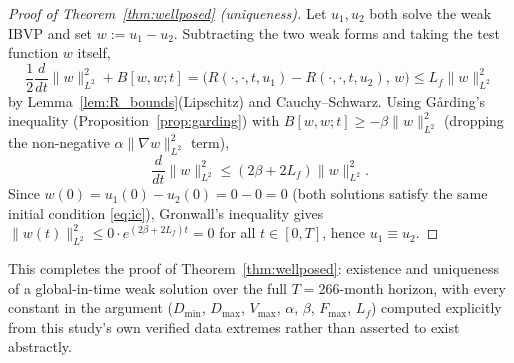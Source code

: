 \documentclass[journal]{IEEEtran}
\begin{document}
\begin{proof}[Proof of Theorem~\ref{thm:wellposed} (uniqueness)]
Let $u_1,u_2$ both solve the weak IBVP and set $w:=u_1-u_2$. Subtracting the two weak forms and taking the test function $w$ itself,
\begin{equation}
\frac{1}{2}\frac{d}{dt}\|w\|^2_{L^2} + B[w,w;t] = \big(R(\cdot,\cdot,t,u_1)-R(\cdot,\cdot,t,u_2),\,w\big) \leq L_f\|w\|^2_{L^2}
\end{equation}
by Lemma~\ref{lem:R_bounds}(Lipschitz) and Cauchy--Schwarz. Using Gårding's inequality (Proposition~\ref{prop:garding}) with $B[w,w;t]\geq-\beta\|w\|^2_{L^2}$ (dropping the non-negative $\alpha\|\nabla w\|^2_{L^2}$ term),
\begin{equation}
\frac{d}{dt}\|w\|^2_{L^2} \leq (2\beta+2L_f)\|w\|^2_{L^2}.
\end{equation}
Since $w(0)=u_1(0)-u_2(0)=0-0=0$ (both solutions satisfy the same initial condition \eqref{eq:ic}), Gronwall's inequality gives $\|w(t)\|^2_{L^2}\leq0\cdot e^{(2\beta+2L_f)t}=0$ for all $t\in[0,T]$, hence $u_1\equiv u_2$.
\end{proof}

This completes the proof of Theorem~\ref{thm:wellposed}: existence and uniqueness of a global-in-time weak solution over the full $T=266$-month horizon, with every constant in the argument ($D_{\min}$, $D_{\max}$, $V_{\max}$, $\alpha$, $\beta$, $F_{\max}$, $L_f$) computed explicitly from this study's own verified data extremes rather than asserted to exist abstractly.
\end{document}
